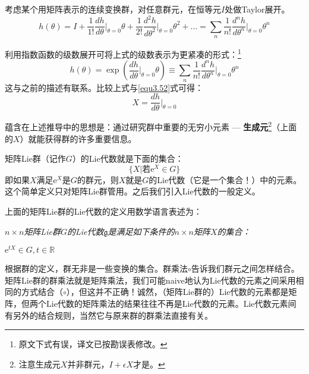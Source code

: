考虑某个用矩阵表示的连续变换群，对任意群元，在恒等元$I$处做Taylor展开。
\begin{equation}
\label{equ3.53}
h(\theta) = I + \frac{1}{1!} \frac{dh}{d\theta} \bigg|_{\theta = 0} \theta +  \frac{1}{2!} \frac{d^2 h}{d \theta^2} \bigg|_{\theta = 0} \theta^2 + \dots = \sum_n \frac{1}{n!} \frac{d^n h}{d \theta^n} \bigg|_{\theta = 0} \theta^n
\end{equation}

利用指数函数的级数展开可将上式的级数表示为更紧凑的形式：\footnote{原文下式有误，译文已按勘误表修改。}
\begin{equation}
\label{equ3.54}
h(\theta) = \exp \left( \frac{dh}{d\theta}\Big|_{\theta = 0} \theta \right) \equiv \sum_n \frac{1}{n!} \frac{d^n h}{d \theta^n}\Bigg|_{\theta = 0} \theta^n
\end{equation}
这与之前的描述有联系。比较上式与\eqref{equ3.52}式可得：
\begin{equation}
\label{equ3.55}
X = \frac{dh}{d\theta}\Bigg|_{\theta = 0}
\end{equation}

蕴含在上述推导中的思想是：通过研究群中重要的无穷小元素 --- {\bf 生成元}\footnote{注意生成元$X$并非群元，$I + \epsilon X$才是。}（上面的$X$）就能获得群的许多重要信息。

矩阵Lie群（记作$G$）的Lie代数就是下面的集合：
\[
\Big\{X \Big| \text{若}\mathrm{e}^X \in G \Big\}
\]
即如果$X$满足$\mathrm{e}^X$是$G$的群元，则$X$就是$G$的Lie代数（它是一个集合！）中的元素。这个简单定义只对矩阵Lie群管用。之后我们引入Lie代数的一般定义。

上面的矩阵Lie群的Lie代数的定义用数学语言表述为：

{ \it
$n \times n$矩阵Lie群$G$的Lie代数$\mathfrak{g}$是满足如下条件的$n \times n$矩阵$X$的集合：

	{\begin{center}
		$\mathrm{e}^{tX} \in G, t \in \mathbb{R}$
	\end{center}
	}
}

根据群的定义，群无非是一些变换的集合。群乘法$\circ$告诉我们群元之间怎样结合。矩阵Lie群的群乘法就是矩阵乘法，我们可能naive地认为Lie代数的元素之间采用相同的方式结合（$\circ$），但这并不正确！诚然，（矩阵Lie群的）Lie代数的元素都是矩阵，但两个Lie代数的矩阵乘法的结果往往不再是Lie代数的元素。Lie代数元素间有另外的结合规则，当然它与原来群的群乘法直接有关。

